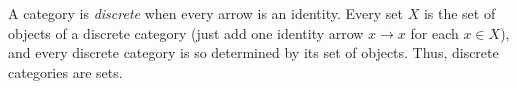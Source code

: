 A category is \emph{discrete} when every arrow is an identity. Every set $X$ is the set of objects of a discrete category (just add one identity arrow $x \to x$ for each $x \in X$), and every discrete category is so determined by its set of objects. Thus, discrete categories are sets.
